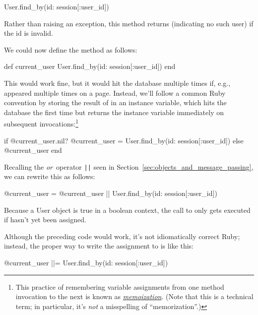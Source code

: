 \begin{code}
User.find_by(id: session[:user_id])
\end{code}

\noindent Rather than raising an exception, this method returns  (indicating no such user) if the id is invalid.

We could now define the  method as follows:

\begin{code}
def current_user
  User.find_by(id: session[:user_id])
end
\end{code}

\noindent This would work fine, but it would hit the database multiple times if, e.g.,  appeared multiple times on a page. Instead, we'll follow a common Ruby convention by storing the result of  in an instance variable, which hits the database the first time but returns the instance variable immediately on subsequent invocations:\footnote{This practice of remembering variable assignments from one method invocation to the next is known as \href{http://en.wikipedia.org/wiki/Memoization}{\emph{memoization}}. (Note that this is a technical term; in particular, it's \emph{not} a misspelling of ``memorization''.)}

\begin{code}
if @current_user.nil?
  @current_user = User.find_by(id: session[:user_id])
else
  @current_user
end
\end{code}

\noindent Recalling the \emph{or}~operator \texttt{||} seen in Section~\ref{sec:objects_and_message_passing}, we can rewrite this as follows:

\begin{code}
@current_user = @current_user || User.find_by(id: session[:user_id])
\end{code}

\noindent Because a User object is true in a boolean context, the call to  only gets executed if  hasn't yet been assigned.

Although the preceding code would work, it's not idiomatically correct Ruby; instead, the proper way to write the assignment to  is like this:

\begin{code}
@current_user ||= User.find_by(id: session[:user_id])
\end{code}

